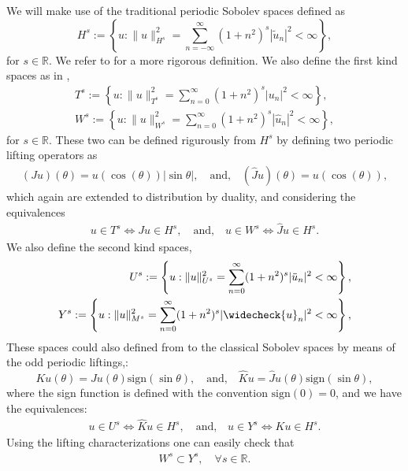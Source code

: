 \documentclass{article}
\newcommand{\IR}{{\mathbb R}}
\begin{document}
We will make use of the traditional periodic Sobolev spaces defined as 
$$
H^s := \left\lbrace u : \| u\|_{H^s}^2 = \sum_{n=-\infty}^\infty (1+n^2)^s |\widetilde{u}_n|^2 < \infty \right\rbrace,
$$
for $s\in \IR$. We refer to \cite[Chapter 5]{saranen2013periodic} for a more rigorous definition. We also define the first kind spaces as in \cite{Averseng2019},
\begin{align*}
T^s := \left\lbrace u : \| u\|_{T^s}^2 = \sum_{n=0}^\infty (1+n^2)^s |{u}_n|^2 < \infty \right\rbrace, \\
W^s := \left\lbrace u : \| u\|_{W^s}^2 = \sum_{n=0}^\infty (1+n^2)^s |\widehat{u}_n|^2 < \infty \right\rbrace,
\end{align*} 
for $s \in \IR$. These two can be defined rigurously from $H^s$ by defining two periodic lifting operators  as 
\begin{align}
\label{eq:liffings}
(Ju) (\theta) = u(\cos(\theta)) | \sin \theta|, \quad \text{and,} \quad
(\widehat{J}u)(\theta) = u (\cos(\theta)),
\end{align}
which again are extended to distribution by duality, and considering the equivalences 
\begin{align*}
u \in T^s \Leftrightarrow Ju \in H^s, \quad \text{and,} \quad u \in W^s \Leftrightarrow \widehat{J}u \in H^s.
\end{align*}
We also define the second kind spaces, 
\begin{align*}
U^s := \left\lbrace u : \| u\|_{U^s}^2 = \sum_{n=0}^\infty (1+n^2)^s |\ddot{u}_n|^2 < \infty \right\rbrace, \\
Y^s := \left\lbrace u : \| {u}\|_{M^s}^2 = \sum_{n=0}^\infty (1+n^2)^s |\widecheck{u}_n|^2 < \infty \right\rbrace,
\end{align*} 
These spaces could also defined from to the classical Sobolev spaces by means of the odd periodic liftings,:
$$
Ku(\theta) = Ju(\theta) \text{sign}(\sin\theta), \quad \text{and,}\quad \widehat{K}u = \widehat{J}u(\theta) \text{sign}(\sin\theta),
$$
where the sign function is defined with the convention $\text{sign}(0)=0$, and we have the equivalences: 
\begin{align*}
u \in U^s \Leftrightarrow \widehat{K}u \in H^s, \quad \text{and,} \quad u \in Y^s \Leftrightarrow Ku \in H^s.
\end{align*}
Using the lifting characterizations one can easily check that 
\begin{align}
\label{eq:WsYs}
W^s \subset Y^s, \quad \forall s \in \IR.
\end{align}
\end{document}
